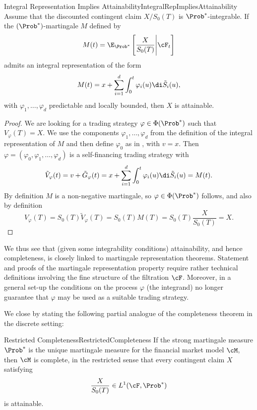 \begin{lem}{Integral Representation Implies Attainability}{IntegralRepImpliesAttainability}
	Assume that the discounted contingent claim \(X/S_0(T)\) is \(\Prob^*\)-integrable. If the \((\Prob^*)\)-martingale \(M\) defined by
	\[
		M(t) = \E_{\Prob^*} \left[ \frac{X}{S_0(T)} \Bigg| \cF_t \right]
	\]
	admits an integral representation of the form
	\[
		M(t) = x + \sum_{i=1}^d \int_0^t \varphi_i(u) \di \tilde{S}_i(u),
	\]
	with \(\varphi_1, \dots, \varphi_d\) predictable and locally bounded, then \(X\) is attainable.
\end{lem}

\begin{proof}
	We are looking for a trading strategy \(\varphi \in \Phi(\Prob^*)\) such that \(V_{\varphi}(T) = X\). We use the components \(\varphi_1, \dots, \varphi_d\) from the definition of the integral representation of \(M\) and then define \(\varphi_0\) as in , with \(v=x\). Then \(\varphi = (\varphi_0, \varphi_1, \dots, \varphi_d)\) is a self-financing trading strategy with
	\[
		\tilde{V}_{\varphi}(t) = v + \tilde{G}_{\varphi}(t) = x + \sum_{i=1}^d \int_0^t \varphi_i(u) \di \tilde{S}_i(u) = M(t).
	\]
	By definition \(M\) is a non-negative martingale, so \(\varphi \in \Phi(\Prob^*)\) follows, and also by definition
	\[
		V_{\varphi}(T) = S_0(T)\tilde{V}_{\varphi}(T) = S_0(T)M(T) = S_0(T)\frac{X}{S_0(T)} = X.
	\]
\end{proof}

We thus see that (given some integrability conditions) attainability, and hence completeness, is closely linked to martingale representation theorems. Statement and proofs of the martingale representation property require rather technical definitions involving the fine structure of the filtration \(\cF\). Moreover, in a general set-up the conditions on the process \(\varphi\) (the integrand) no longer guarantee that \(\varphi\) may be used as a suitable trading strategy.

We close by stating the following partial analogue of the completeness theorem in the discrete setting:

\begin{thm}{Restricted Completeness}{RestrictedCompleteness}
	If the strong martingale measure \(\Prob^*\) is the unique martingale measure for the financial market model \(\cM\), then \(\cM\) is complete, in the restricted sense that every contingent claim \(X\) satisfying
	\[
		\frac{X}{S_0(T)} \in L^1(\cF, \Prob^*)
	\]
	is attainable.
\end{thm}

